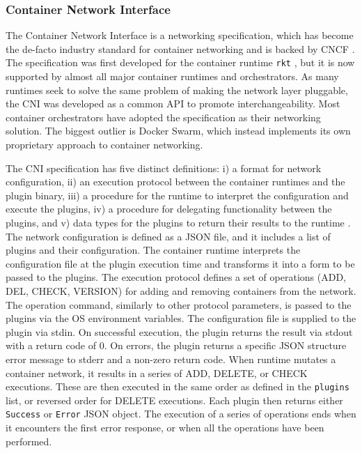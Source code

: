 \documentclass[english, 12pt, a4paper, sci, utf8, a-2b, online]{aaltothesis}
\begin{document}
\subsubsection{Container Network Interface} \label{cni}

The Container Network Interface \cite{cni} is a networking specification, which has become the de-facto industry standard for container networking and is backed by CNCF \cite{qi2020assessing}.
The specification was first developed for the container runtime \texttt{rkt} \cite{hausenblas2018container}, but it is now supported by almost all major container runtimes and orchestrators.
As many runtimes seek to solve the same problem of making the network layer pluggable, the CNI was developed as a common API to promote interchangeability.
Most container orchestrators have adopted the specification as their networking solution.
The biggest outlier is Docker Swarm, which instead implements its own proprietary approach to container networking.

The CNI specification has five distinct definitions: i) a format for network configuration, ii) an execution protocol between the container runtimes and the plugin binary, iii) a procedure for the runtime to interpret the configuration and execute the plugins, iv) a procedure for delegating functionality between the plugins, and v) data types for the plugins to return their results to the runtime \cite{cni}.
The network configuration is defined as a JSON file, and it includes a list of plugins and their configuration.
The container runtime interprets the configuration file at the plugin execution time and transforms it into a form to be passed to the plugins.
The execution protocol defines a set of operations (ADD, DEL, CHECK, VERSION) for adding and removing containers from the network.
The operation command, similarly to other protocol parameters, is passed to the plugins via the OS environment variables.
The configuration file is supplied to the plugin via stdin.
On successful execution, the plugin returns the result via stdout with a return code of 0.
On errors, the plugin returns a specific JSON structure error message to stderr and a non-zero return code.
When runtime mutates a container network, it results in a series of ADD, DELETE, or CHECK executions.
These are then executed in the same order as defined in the \texttt{plugins} list, or reversed order for DELETE executions.
Each plugin then returns either \texttt{Success} or \texttt{Error} JSON object.
The execution of a series of operations ends when it encounters the first error response, or when all the operations have been performed.
\end{document}

